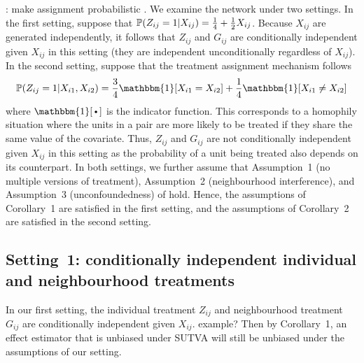 \documentclass[10pt]{article}
\begin{document}
\todo: make assignment probabilistic \parencite{Imbens:2015}. We examine the network under two settings. In the first setting, suppose that $\P(Z_{ij}=1|X_{ij}) = \frac{1}{4} + \frac{1}{2}X_{ij}$.
Because $X_{ij}$ are generated independently, it follows that $Z_{ij}$ and $G_{ij}$ are conditionally independent given $X_{ij}$ in this setting (they are independent unconditionally regardless of $X_{ij}$). In the second setting, suppose that the treatment assignment mechanism follows
\[
\P(Z_{ij}=1|X_{i1},X_{i2}) = \frac{3}{4}\mathbbm{1}[X_{i1}=X_{i2}] + \frac{1}{4}\mathbbm{1}[X_{i1}\neq X_{i2}]
\]
where $\mathbbm{1}[\argdot]$ is the indicator function. This corresponds to a homophily situation where the units in a pair are more likely to be treated if they share the same value of the covariate. Thus, $Z_{ij}$ and $G_{ij}$ are not conditionally independent given $X_{ij}$ in this setting as the probability of a unit being treated also depends on its counterpart.
In both settings, we further assume that Assumption~1 (no multiple versions of treatment), Assumption~2 (neighbourhood interference), and Assumption~3 (unconfoundedness) of \textcite{Forastiere:2021} hold. Hence, the assumptions of Corollary~1 are satisfied in the first setting, and the assumptions of Corollary~2 are satisfied in the second setting.

\subsection{Setting~1: conditionally independent individual and neighbourhood treatments}

In our first setting, the individual treatment $Z_{ij}$ and neighbourhood treatment $G_{ij}$ are conditionally independent given $X_{ij}$. \todo example? Then by Corollary~1, an effect estimator that is unbiased under SUTVA will still be unbiased under the assumptions of our setting.
\\
\end{document}
